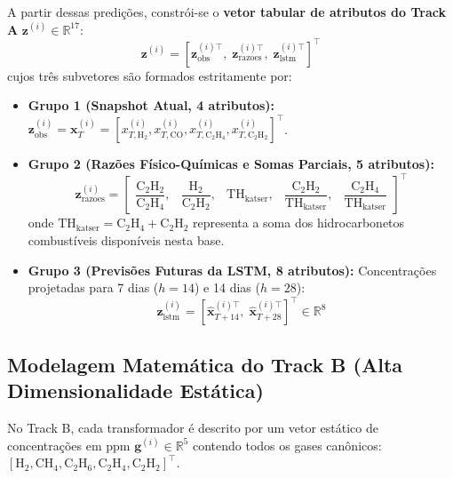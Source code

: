 \documentclass[11pt,a4paper]{article}
\begin{document}
A partir dessas predições, constrói-se o \textbf{vetor tabular de atributos do Track A} $\mathbf{z}^{(i)} \in \mathbb{R}^{17}$:
\begin{equation}
  \mathbf{z}^{(i)} = \left[ \mathbf{z}_{\text{obs}}^{(i)\top}, \; \mathbf{z}_{\text{razoes}}^{(i)\top}, \; \mathbf{z}_{\text{lstm}}^{(i)\top} \right]^\top
\end{equation}
cujos três subvetores são formados estritamente por:
\begin{itemize}
  \item \textbf{Grupo 1 (Snapshot Atual, 4 atributos):} $\mathbf{z}_{\text{obs}}^{(i)} = \mathbf{x}_T^{(i)} = [x_{T, \text{H}_2}^{(i)}, x_{T, \text{CO}}^{(i)}, x_{T, \text{C}_2\text{H}_4}^{(i)}, x_{T, \text{C}_2\text{H}_2}^{(i)}]^\top$.
  \item \textbf{Grupo 2 (Razões Físico-Químicas e Somas Parciais, 5 atributos):}
  \begin{equation}
    \mathbf{z}_{\text{razoes}}^{(i)} = \begin{bmatrix}
      \dfrac{\text{C}_2\text{H}_2}{\text{C}_2\text{H}_4}, & 
      \dfrac{\text{H}_2}{\text{C}_2\text{H}_2}, & 
      \text{TH}_{\text{katser}}, & 
      \dfrac{\text{C}_2\text{H}_2}{\text{TH}_{\text{katser}}}, & 
      \dfrac{\text{C}_2\text{H}_4}{\text{TH}_{\text{katser}}}
    \end{bmatrix}^\top
  \end{equation}
  onde $\text{TH}_{\text{katser}} = \text{C}_2\text{H}_4 + \text{C}_2\text{H}_2$ representa a soma dos hidrocarbonetos combustíveis disponíveis nesta base.
  \item \textbf{Grupo 3 (Previsões Futuras da LSTM, 8 atributos):} Concentrações projetadas para 7 dias ($h=14$) e 14 dias ($h=28$):
  \begin{equation}
    \mathbf{z}_{\text{lstm}}^{(i)} = \left[ \hat{\mathbf{x}}_{T+14}^{(i)\top}, \; \hat{\mathbf{x}}_{T+28}^{(i)\top} \right]^\top \in \mathbb{R}^8
  \end{equation}
\end{itemize}

\subsection{Modelagem Matemática do Track B (Alta Dimensionalidade Estática)}
\label{sec:mat_track_b}

No Track B, cada transformador é descrito por um vetor estático de concentrações em ppm $\mathbf{g}^{(i)} \in \mathbb{R}^5$ contendo todos os gases canônicos: $[\text{H}_2, \text{CH}_4, \text{C}_2\text{H}_6, \text{C}_2\text{H}_4, \text{C}_2\text{H}_2]^\top$.
\end{document}
